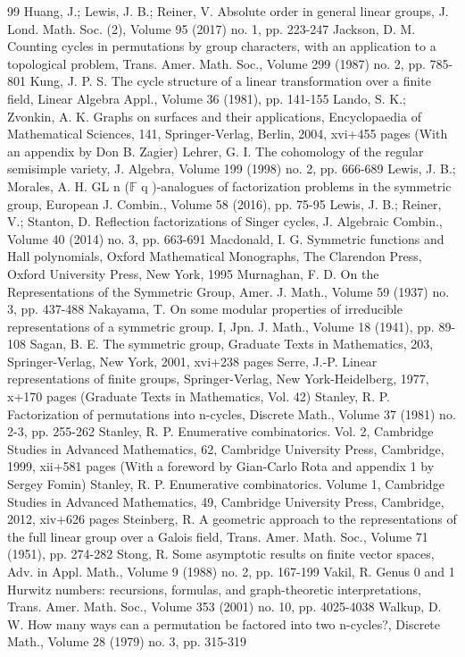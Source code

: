 \documentclass[10pt]{article}
\theoremstyle{definition}
\begin{document}
\begin{thebibliography}{99}
Huang, J.; Lewis, J. B.; Reiner, V. Absolute order in general linear groups, J. Lond. Math. Soc. (2), Volume 95 (2017) no. 1, pp. 223-247
Jackson, D. M. Counting cycles in permutations by group characters, with an application to a topological problem, Trans. Amer. Math. Soc., Volume 299 (1987) no. 2, pp. 785-801
Kung, J. P. S. The cycle structure of a linear transformation over a finite field, Linear Algebra Appl., Volume 36 (1981), pp. 141-155
Lando, S. K.; Zvonkin, A. K. Graphs on surfaces and their applications, Encyclopaedia of Mathematical Sciences, 141, Springer-Verlag, Berlin, 2004, xvi+455 pages (With an appendix by Don B. Zagier)
Lehrer, G. I. The cohomology of the regular semisimple variety, J. Algebra, Volume 199 (1998) no. 2, pp. 666-689
Lewis, J. B.; Morales, A. H.  GL  n (\(\mathbb{F}\) q )-analogues of factorization problems in the symmetric group, European J. Combin., Volume 58 (2016), pp. 75-95
Lewis, J. B.; Reiner, V.; Stanton, D. Reflection factorizations of Singer cycles, J. Algebraic Combin., Volume 40 (2014) no. 3, pp. 663-691
Macdonald, I. G. Symmetric functions and Hall polynomials, Oxford Mathematical Monographs, The Clarendon Press, Oxford University Press, New York, 1995
Murnaghan, F. D. On the Representations of the Symmetric Group, Amer. J. Math., Volume 59 (1937) no. 3, pp. 437-488
Nakayama, T. On some modular properties of irreducible representations of a symmetric group. I, Jpn. J. Math., Volume 18 (1941), pp. 89-108
Sagan, B. E. The symmetric group, Graduate Texts in Mathematics, 203, Springer-Verlag, New York, 2001, xvi+238 pages
Serre, J.-P. Linear representations of finite groups, Springer-Verlag, New York-Heidelberg, 1977, x+170 pages (Graduate Texts in Mathematics, Vol. 42)
Stanley, R. P. Factorization of permutations into n-cycles, Discrete Math., Volume 37 (1981) no. 2-3, pp. 255-262
Stanley, R. P. Enumerative combinatorics. Vol. 2, Cambridge Studies in Advanced Mathematics, 62, Cambridge University Press, Cambridge, 1999, xii+581 pages (With a foreword by Gian-Carlo Rota and appendix 1 by Sergey Fomin)
Stanley, R. P. Enumerative combinatorics. Volume 1, Cambridge Studies in Advanced Mathematics, 49, Cambridge University Press, Cambridge, 2012, xiv+626 pages
Steinberg, R. A geometric approach to the representations of the full linear group over a Galois field, Trans. Amer. Math. Soc., Volume 71 (1951), pp. 274-282
Stong, R. Some asymptotic results on finite vector spaces, Adv. in Appl. Math., Volume 9 (1988) no. 2, pp. 167-199
Vakil, R. Genus 0 and 1 Hurwitz numbers: recursions, formulas, and graph-theoretic interpretations, Trans. Amer. Math. Soc., Volume 353 (2001) no. 10, pp. 4025-4038
Walkup, D. W. How many ways can a permutation be factored into two n-cycles?, Discrete Math., Volume 28 (1979) no. 3, pp. 315-319
\end{thebibliography}
\end{document}
